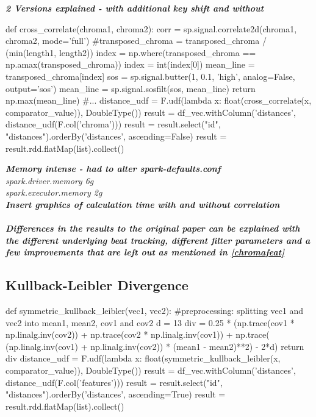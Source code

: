 \textit{\textbf{2 Versions explained - with additional key shift and without}}
\begin{pythonCode}
def cross_correlate(chroma1, chroma2):
    corr = sp.signal.correlate2d(chroma1, chroma2, mode='full')
    #transposed_chroma = transposed_chroma / (min(length1, length2))
    index = np.where(transposed_chroma == np.amax(transposed_chroma))
    index = int(index[0])
    mean_line = transposed_chroma[index]
    sos = sp.signal.butter(1, 0.1, 'high', analog=False, output='sos')
    mean_line = sp.signal.sosfilt(sos, mean_line)
    return np.max(mean_line)
#...
distance_udf = F.udf(lambda x: float(cross_correlate(x, comparator_value)), DoubleType())
result = df_vec.withColumn('distances', distance_udf(F.col('chroma')))
result = result.select("id", "distances").orderBy('distances', ascending=False)
result = result.rdd.flatMap(list).collect()
\end{pythonCode}

\noindent\textbf{\textit{Memory intense - had to alter spark-defaults.conf\\}}
\textit{spark.driver.memory             6g\\
spark.executor.memory           2g\\
}
\noindent\textbf{\textit{Insert graphics of calculation time with and without correlation\\}}
\ \\
\noindent\textbf{\textit{Differences in the results to the original paper can be explained with the different underlying beat tracking, different filter parameters and a few improvements that are left out as mentioned in \ref{chromafeat}}\cite{cover802}}

\subsection{Kullback-Leibler Divergence}

\begin{pythonCode}
def symmetric_kullback_leibler(vec1, vec2):
	#preprocessing: splitting vec1 and vec2 into mean1, mean2, cov1 and cov2
    d = 13
    div = 0.25 * (np.trace(cov1 * np.linalg.inv(cov2)) + np.trace(cov2 * np.linalg.inv(cov1)) + np.trace( (np.linalg.inv(cov1) + np.linalg.inv(cov2)) * (mean1 - mean2)**2) - 2*d)
    return div
distance_udf = F.udf(lambda x: float(symmetric_kullback_leibler(x, comparator_value)), DoubleType())
result = df_vec.withColumn('distances', distance_udf(F.col('features')))
result = result.select("id", "distances").orderBy('distances', ascending=True)
result = result.rdd.flatMap(list).collect()
\end{pythonCode}

